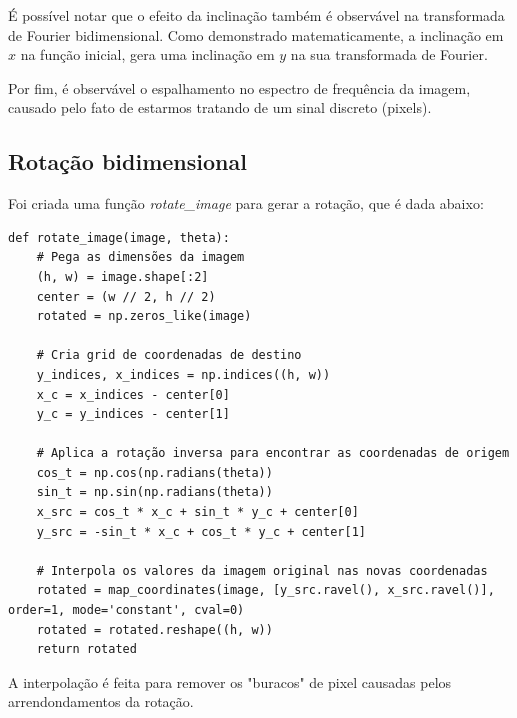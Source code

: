É possível notar que o efeito da inclinação também é observável na transformada de Fourier bidimensional. Como demonstrado matematicamente, a inclinação em $x$ na função inicial, gera uma inclinação em $y$ na sua transformada de Fourier. 

Por fim, é observável o espalhamento no espectro de frequência da imagem, causado pelo fato de estarmos tratando de um sinal discreto (pixels).

\subsection{Rotação bidimensional}
Foi criada uma função \textit{rotate\_image} para gerar a rotação, que é dada abaixo:

\begin{lstlisting}
def rotate_image(image, theta):
    # Pega as dimensões da imagem
    (h, w) = image.shape[:2]
    center = (w // 2, h // 2)
    rotated = np.zeros_like(image)

    # Cria grid de coordenadas de destino
    y_indices, x_indices = np.indices((h, w))
    x_c = x_indices - center[0]
    y_c = y_indices - center[1]

    # Aplica a rotação inversa para encontrar as coordenadas de origem
    cos_t = np.cos(np.radians(theta))
    sin_t = np.sin(np.radians(theta))
    x_src = cos_t * x_c + sin_t * y_c + center[0]
    y_src = -sin_t * x_c + cos_t * y_c + center[1]

    # Interpola os valores da imagem original nas novas coordenadas
    rotated = map_coordinates(image, [y_src.ravel(), x_src.ravel()], order=1, mode='constant', cval=0)
    rotated = rotated.reshape((h, w))
    return rotated
\end{lstlisting}

A interpolação é feita para remover os "buracos" de pixel causadas pelos arrendondamentos da rotação.


